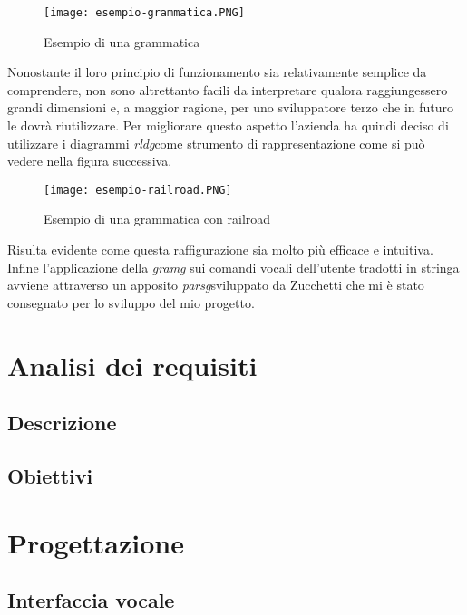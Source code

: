 \begin{figure}[htbp]
	\begin{center}
		\texttt{[image: esempio-grammatica.PNG]}
		\caption{Esempio di una grammatica}
	\end{center}
\end{figure}

\vspace{5cm}

Nonostante il loro principio di funzionamento sia relativamente semplice da comprendere, non sono altrettanto facili da interpretare qualora raggiungessero grandi dimensioni e, a maggior ragione, per uno sviluppatore terzo che in futuro le dovrà riutilizzare. Per migliorare questo aspetto l'azienda ha quindi deciso di utilizzare i diagrammi \emph{\gls{rldg}}\glsfirstoccur come strumento di rappresentazione come si può vedere nella figura successiva.

\begin{figure}[htbp]
	\begin{center}
		\texttt{[image: esempio-railroad.PNG]}
		\caption{Esempio di una grammatica con railroad}
	\end{center}
\end{figure}

Risulta evidente come questa raffigurazione sia molto più efficace e intuitiva. \\
Infine l'applicazione della \emph{\gls{gramg}} sui comandi vocali dell'utente tradotti in stringa avviene attraverso un apposito \emph{\gls{parsg}}\glsfirstoccur sviluppato da Zucchetti che mi è stato consegnato per lo sviluppo del mio progetto.
\section{Analisi dei requisiti}
	\subsection{Descrizione}
	\subsection{Obiettivi}

\section{Progettazione}
	\subsection{Interfaccia vocale}
